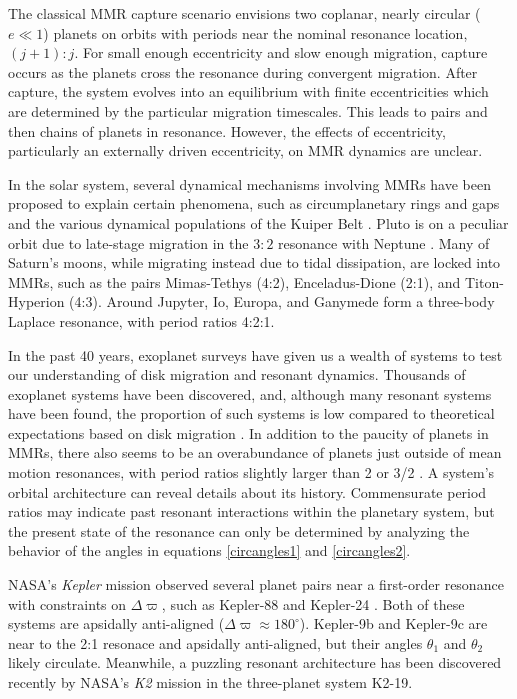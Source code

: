 \documentclass[usenatbib,onecolumn]{mnras}
\begin{document}
The classical MMR capture scenario envisions two coplanar, nearly
circular (\(e\ll 1\)) planets on orbits with periods near the nominal
resonance location, \((j+1):j\). For small enough eccentricity and slow
enough migration, capture occurs as the planets cross the resonance
during convergent migration.  After capture, the system evolves into
an equilibrium with finite eccentricities which are determined by the
particular migration timescales.  This leads to pairs and then chains
of planets in resonance.  However, the effects of eccentricity,
particularly an externally driven eccentricity, on MMR dynamics are
unclear.

In the solar system, several dynamical mechanisms involving MMRs have
been proposed to explain certain phenomena, such as circumplanetary
rings and gaps and the various dynamical populations of the Kuiper
Belt
\citep{goldreich77_reven_tiny_miran,Malhotra2020Asteroid,malhotra_resonant_2019}.
Pluto is on a peculiar orbit due to late-stage migration in the \(3:2\)
resonance with Neptune \citep{malhotra_origin_1995}.  Many of Saturn's
moons, while migrating instead due to tidal dissipation, are locked
into MMRs, such as the pairs Mimas-Tethys (4:2), Enceladus-Dione
(2:1), and Titon-Hyperion (4:3). Around Jupyter, Io, Europa, and
Ganymede form a three-body Laplace resonance, with period ratios
4:2:1.

In the past 40 years, exoplanet surveys have given us a wealth of
systems to test our understanding of disk migration and resonant
dynamics.  Thousands of exoplanet systems have been discovered, and,
although many resonant systems have been found, the proportion of such
systems is low compared to theoretical expectations based on disk
migration \citep{fabrycky_architecture_2014}.  In addition to the paucity
of planets in MMRs, there also seems to be an overabundance of planets
just outside of mean motion resonances, with period ratios slightly
larger than 2 or 3/2
\citep{fabrycky_architecture_2014,choksi_sub-neptune_2020}.  A system's
orbital architecture can reveal details about its history.
Commensurate period ratios may indicate past resonant interactions
within the planetary system, but the present state of the resonance
can only be determined by analyzing the behavior of the angles in
equations \eqref{circangles1} and \eqref{circangles2}.  

NASA's \emph{Kepler} mission observed several planet pairs near a
first-order resonance with constraints on \(\Delta\varpi\), such as
Kepler-88 \citep{weiss_discovery_2020} and Kepler-24
\citep{antoniadou_exploiting_2020}. Both of these systems are apsidally
anti-aligned (\(\Delta\varpi\approx180^\circ\)).  Kepler-9b and
Kepler-9c are near to the 2:1 resonace and apsidally anti-aligned, but
their angles \(\theta_1\) and \(\theta_2\) likely circulate.
Meanwhile, a
puzzling resonant architecture has been discovered recently
by NASA's \emph{K2} mission in the
three-planet system K2-19.
\end{document}
